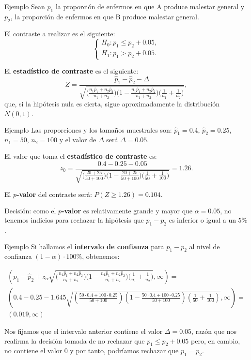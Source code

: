 \documentclass[
  ignorenonframetext,
]{beamer}
\begin{document}
\begin{frame}{Ejemplo}
\protect\hypertarget{ejemplo-16}{}
Sean \(p_1\) la proporción de enfermos en que A produce malestar general
y \(p_2\), la proporción de enfermos en que B produce malestar general.

El contraste a realizar es el siguiente: \[
\left\{\begin{array}{l}
H_0:p_1\leq p_2+0.05,\\
H_1:p_1>p_2+0.05.
\end{array}\right.
\]

El \textbf{estadístico de contraste} es el siguiente: \[
Z=\frac{\widehat{p}_1 -\widehat{p}_2-\Delta}{
\sqrt{\Big(\frac{n_1 \widehat{p}_1 +n_2 \widehat{p}_2}{n_1
+n_2}\Big)\Big(1-\frac{n_1 \widehat{p}_1 +n_2 \widehat{p}_2}{n_1
+n_2}\Big)\Big(\frac1{n_1}+\frac1{n_2}
\Big)}},
\] que, si la hipótesis nula es cierta, sigue aproximadamente la
distribución \(N(0,1)\).
\end{frame}

\begin{frame}{Ejemplo}
\protect\hypertarget{ejemplo-17}{}
Las proporciones y los tamaños muestrales son: \(\widehat{p}_1=0.4\),
\(\widehat{p}_2=0.25\), \(n_1=50\), \(n_2=100\) y el valor de \(\Delta\)
será \(\Delta=0.05\).

El valor que toma el \textbf{estadístico de contraste} es: \[
z_0=\frac{0.4-0.25-0.05}{
\sqrt{\Big(\frac{20+25}{50+100}\Big)\Big(1-\frac{20+25}{50+100}\Big)\Big(\frac1{50}+\frac1{100}\Big)}}=1.26.
\]

El \textbf{\(p\)-valor} del contraste será: \(P(Z\geq 1.26)= 0.104.\)

Decisión: como el \textbf{\(p\)-valor} es relativamente grande y mayor
que \(\alpha=0.05\), no tenemos indicios para rechazar la hipótesis que
\(p_1-p_2\) es inferior o igual a un \(5\%\).
\end{frame}

\begin{frame}{Ejemplo}
\protect\hypertarget{ejemplo-18}{}
Si hallamos el \textbf{intervalo de confianza} para \(p_1-p_2\) al nivel
de confianza \((1-\alpha)\cdot 100\%\), obtenemos:

\[
\begin{array}{l}
\left(\widehat{p}_1-\widehat{p}_2+z_{\alpha}\sqrt{\Big(\frac{n_1 \widehat{p}_1 +n_2 \widehat{p}_2}{n_1
+n_2}\Big)\Big(1-\frac{n_1 \widehat{p}_1 +n_2 \widehat{p}_2}{n_1
+n_2}\Big)\Big(\frac1{n_1}+\frac1{n_2}
\Big)},\infty
\right) =  \\
\left(0.4-0.25 -1.645\sqrt{\left(\frac{50 \cdot 0.4 +100\cdot 0.25}{50
+100}\right)\left(1-\frac{50 \cdot 0.4 +100\cdot 0.25}{50
+100}\right)\left(\frac1{50}+\frac1{100}\right)},\infty\right) = \\
(0.019,\infty)
\end{array}
\]

Nos fijamos que el intervalo anterior contiene el valor
\(\Delta =0.05\), razón que nos reafirma la decisión tomada de no
rechazar que \(p_1\leq p_2+ 0.05\) pero, en cambio, no contiene el valor
\(0\) y por tanto, podríamos rechazar que \(p_1=p_2\).
\end{frame}
\end{document}
